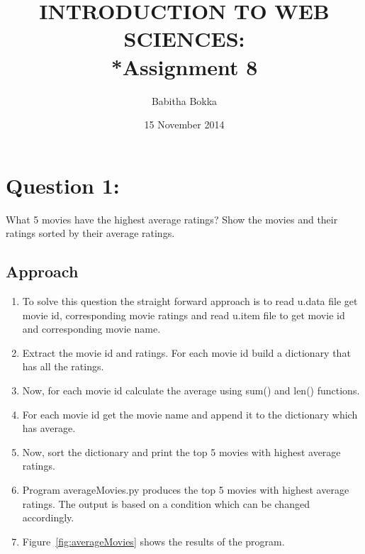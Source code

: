 \documentclass[12pt]{article}
\begin{document}
\begin{titlepage}
\title{INTRODUCTION TO WEB SCIENCES:\\*Assignment 8}
\author{Babitha Bokka}
\date{15 November 2014}
\maketitle
\end{titlepage}

\tableofcontents
\newpage
\section{Question 1:}
What 5 movies have the highest average ratings? Show the movies
and their ratings sorted by their average ratings.
\subsection{Approach}
\begin{enumerate}
    \item To solve this question the straight forward approach is to read u.data file get movie id, corresponding movie ratings and read u.item file to get movie id and corresponding movie name.
    \item Extract the movie id and ratings. For each movie id build a dictionary that has all the ratings.
    \item Now, for each movie id calculate the average using sum() and len() functions.
    \item For each movie id get the movie name and append it to the dictionary which has average.
    \item Now, sort the dictionary and print the top 5 movies with highest average ratings.
    \item Program averageMovies.py produces the top 5 movies with highest average ratings. The output is based on a condition which can be changed accordingly.
    \item Figure~\ref{fig:averageMovies} shows the results of the program. 
\end{enumerate}
   
\end{document}

